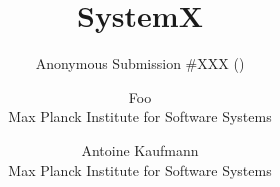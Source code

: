 \documentclass[a4paper,twocolumn,10pt]{article}
\newcommand{\sys}{SystemX\xspace}
\newcommand{\sys}{MySystem\xspace}
\begin{document}
\date{}
\title{\sys}

\if {}
  \author{Anonymous Submission \#XXX (\pageref{page:last pages})}
\else
  \author{
    Foo\\
    Max Planck Institute for Software Systems
    \and
    Antoine Kaufmann\\
    Max Planck Institute for Software Systems
    }
\fi

\maketitle










\if {}

\fi





\label{page:last}
\end{document}
